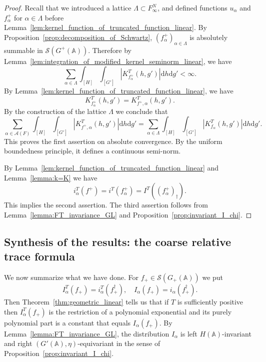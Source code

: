 \documentclass[letterpaper,11pt]{amsart}
\newcommand{\bA}{\mathbb{A}}
\newcommand{\cA}{\mathcal{A}}
\newcommand{\cS}{\mathcal{S}}
\newcommand{\rd}{\mathrm{d}}
\newcommand{\<}{\negthickspace}
\theoremstyle{definition}
\theoremstyle{plain}
\theoremstyle{remark}
\numberwithin{equation}{section}
\begin{document}
\begin{proof}
Recall that we introduced a lattice $\Lambda \subset F_\infty^N$, and defined functions $u_{\alpha}$ and $f^+_\alpha$ for $\alpha \in \Lambda$ before Lemma~\ref{lem:kernel_function_of_truncated_function_linear}.  By Proposition~\ref{prop:decomposition_of_Schwartz}, $(f^+_\alpha)_{\alpha \in
\Lambda}$ is absolutely summable in $\cS(G^+(\bA))$. Therefore by
Lemma~\ref{lem:integration_of_modified_kernel_seminorm_linear}, we have
    \[
    \sum_{\alpha \in \Lambda} \int_{[H]} \int_{[G']}
    \left|  K_{f^+_\alpha}^T(h,g') \right| \rd h \rd g' < \infty.
    \]
By Lemma~\ref{lem:kernel_function_of_truncated_function_linear}, we have
    \[
    K_{f^+_\alpha}^T(h,g') = K_{f^+, \alpha}^T(h, g').
    \]
By the construction of the lattice $\Lambda$ we conclude that
    \[
    \sum_{\alpha \in \cA(F)}  \int_{[H]} \int_{[G']}
    \left| K_{f^+,\alpha}^T(h,g') \right| \rd h \rd g' =
    \sum_{\alpha \in \Lambda}  \int_{[H]} \int_{[G']}
    \left|  K_{f_\alpha}^T(h,g') \right| \rd h \rd g'.
    \]
This proves the first assertion on absolute convergence. By the uniform boundedness principle, it defines a continuous semi-norm.


By
Lemma~\ref{lem:kernel_function_of_truncated_function_linear} and Lemma~\ref{lemma:k=K} we have
    \[
    i^T_{\alpha}(f^+) = i^T(f^+_{\alpha}) = I^T( (f^+_{\alpha})_{\dag}).
    \]
This implies the second assertion. The third assertion follows from
Lemma~\ref{lemma:FT_invariance_GL} and
Proposition~\ref{prop:invariant_I_chi}.
\end{proof}














\subsection{Synthesis of the results: the coarse relative trace formula}

We now summarize what we have done. For $f_+ \in \cS(G_+(\bA))$ we put
    \[
    I_{\alpha}^T(f_+) = i_{\alpha}^T(f_+^\dag), \quad
    I_{\alpha}(f_+) = i_{\alpha}(f_+^\dag).
    \]
Then Theorem~\ref{thm:geometric_linear} tells us that if $T$ is sufficiently
positive then $I_{\alpha}^T(f_+)$ is the restriction of a polynomial
exponential and its purely polynomial part is a constant that equals
$I_{\alpha}(f_+)$. By Lemma~\ref{lemma:FT_invariance_GL}, the distribution
$I_{\alpha}$ is left $H(\bA)$-invariant and right
$(G'(\bA),\eta)$-equivariant in the sense of
Proposition~\ref{prop:invariant_I_chi}.
\end{document}

